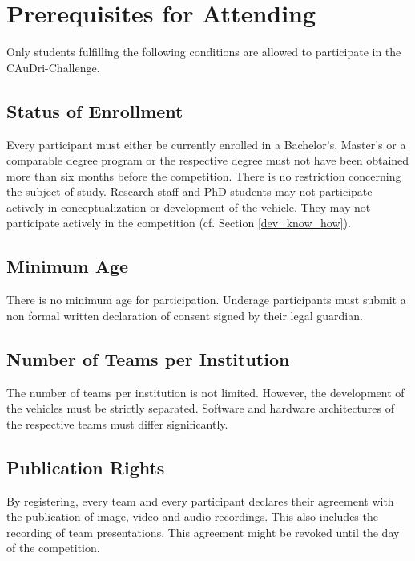 \chapter{Prerequisites for Attending}

Only students fulfilling the following conditions are allowed to participate in
the CAuDri-Challenge.

\section{Status of Enrollment}

Every participant must either be currently enrolled in a Bachelor’s, Master’s
or a comparable degree program or the respective degree must not have been
obtained more than six months before the competition. There is no restriction
concerning the subject of study. Research staff and PhD students may not
participate actively in conceptualization or development of the vehicle. They
may not participate actively in the competition (cf. Section
\ref{dev_know_how}).


\section{Minimum Age}

There is no minimum age for participation. Underage participants must submit a
non formal written declaration of consent signed by their legal guardian.

\section{Number of Teams per Institution}

The number of teams per institution is not limited. However, the development of
the vehicles must be strictly separated. Software and hardware architectures of
the respective teams must differ significantly.

\section{Publication Rights}

By registering, every team and every participant declares their agreement with
the publication of image, video and audio recordings. This also includes the
recording of team presentations. This agreement might be revoked until the day
of the competition.